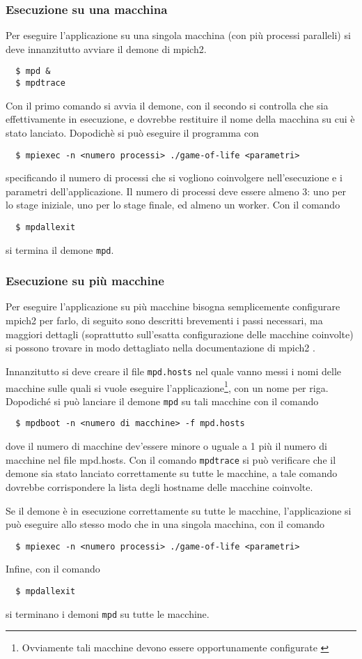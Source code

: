 \subsubsection*{Esecuzione su una macchina}
Per eseguire l'applicazione su una singola macchina (con pi\`u processi paralleli) si deve innanzitutto avviare il demone di mpich2.
\begin{verbatim}
  $ mpd &
  $ mpdtrace
\end{verbatim}
Con il primo comando si avvia il demone, con il secondo si controlla che sia effettivamente in esecuzione, e dovrebbe restituire il nome della macchina su cui \`e stato lanciato. Dopodich\`e si pu\`o eseguire il programma con
\begin{verbatim}
  $ mpiexec -n <numero processi> ./game-of-life <parametri>
\end{verbatim}
specificando il numero di processi che si vogliono coinvolgere nell'esecuzione e i parametri dell'applicazione. Il numero di processi deve essere almeno 3: uno per lo stage iniziale, uno per lo stage finale, ed almeno un worker. Con il comando
\begin{verbatim}
  $ mpdallexit
\end{verbatim}
si termina il demone \texttt{mpd}.

\subsubsection*{Esecuzione su pi\`u macchine}
Per eseguire l'applicazione su pi\`u macchine bisogna semplicemente configurare mpich2 per farlo, di seguito sono descritti brevementi i passi necessari, ma maggiori dettagli (soprattutto sull'esatta configurazione delle macchine coinvolte) si possono trovare in modo dettagliato nella documentazione di mpich2 \cite{bib:ref6}.

Innanzitutto si deve creare il file \texttt{mpd.hosts} nel quale vanno messi i nomi delle macchine sulle quali si vuole eseguire l'applicazione\footnote{Ovviamente tali macchine devono essere opportunamente configurate \cite{bib:ref6}}, con un nome per riga. Dopodich\'e si pu\`o lanciare il demone \texttt{mpd} su tali macchine con il comando
\begin{verbatim}
  $ mpdboot -n <numero di macchine> -f mpd.hosts
\end{verbatim}
dove il numero di macchine dev'essere minore o uguale a 1 pi\`u il numero di macchine nel file mpd.hosts. Con il comando \texttt{mpdtrace} si pu\`o verificare che il demone sia stato lanciato correttamente su tutte le macchine, a tale comando dovrebbe corrispondere la lista degli hostname delle macchine coinvolte.

Se il demone \`e in esecuzione correttamente su tutte le macchine, l'applicazione si pu\`o eseguire allo stesso modo che in una singola macchina, con il comando
\begin{verbatim}
  $ mpiexec -n <numero processi> ./game-of-life <parametri>
\end{verbatim}
Infine, con il comando
\begin{verbatim}
  $ mpdallexit
\end{verbatim}
si terminano i demoni \texttt{mpd} su tutte le macchine.
